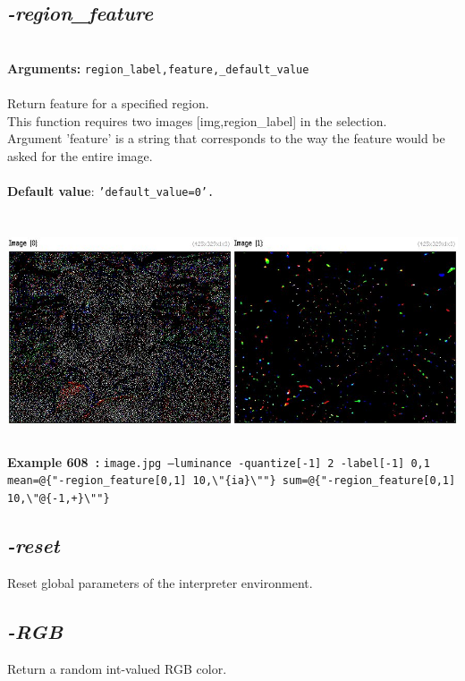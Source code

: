 \documentclass[a4paper,11pt,twoside]{book}
\begin{document}
\subsection{\emph{-region\_feature} }\vspace*{-0.5em}
~\\\textbf{Arguments: } 
{\small \texttt{region\_label,feature,\_default\_value}}\\~\\
Return feature for a specified region.
~\\This function requires two images [img,region\_label] in the selection.
~\\Argument 'feature' is a string that corresponds to the way the feature would
be asked for the entire image.
~\\~\\\textbf{Default value}: {\small \texttt{'default\_value=0'.}}
\begin{center}\includegraphics[keepaspectratio=true,height=7cm,width=\textwidth]{img/gmic_def608.jpg}\\
{\footnotesize \textbf{Example 608~:} \texttt{image.jpg --luminance -quantize[-1] 2 -label[-1] 0,1 mean=@\{"-region\_feature[0,1] 10,\textbackslash "\{ia\}\textbackslash ""\} sum=@\{"-region\_feature[0,1] 10,\textbackslash "@\{-1,+\}\textbackslash ""\}}}
\end{center}

\subsection{\emph{-reset} }\vspace*{-0.5em}
Reset global parameters of the interpreter environment.


\subsection{\emph{-RGB} }\vspace*{-0.5em}
Return a random int-valued RGB color.
\end{document}
